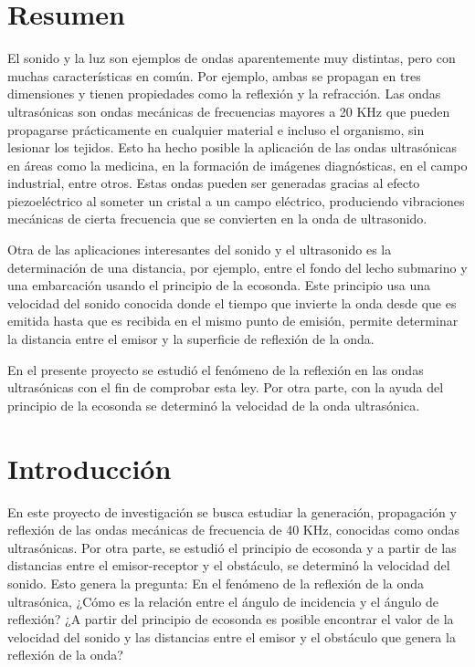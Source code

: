 \documentclass[spanish,notitlepage,letterpaper, 12pt]{article}
\begin{document}

\tableofcontents

\newpage

\section{Resumen}
El sonido y la luz son ejemplos de ondas aparentemente muy distintas, pero con
muchas características en común. Por ejemplo, ambas se propagan en tres dimensiones y
tienen propiedades como la reflexión y la refracción. Las ondas ultrasónicas son ondas
mecánicas de frecuencias mayores a 20 KHz que pueden propagarse prácticamente en
cualquier material e incluso el organismo, sin lesionar los tejidos. Esto ha hecho posible la
aplicación de las ondas ultrasónicas en áreas como la medicina, en la formación de
imágenes diagnósticas, en el campo industrial, entre otros. Estas ondas pueden ser generadas
gracias al efecto piezoeléctrico al someter un cristal a un campo eléctrico, produciendo
vibraciones mecánicas de cierta frecuencia que se convierten en la onda de ultrasonido.\par
\bigskip
Otra de las aplicaciones interesantes del sonido y el ultrasonido es la determinación de una
distancia, por ejemplo, entre el fondo del lecho submarino y una embarcación usando el
principio de la ecosonda. Este principio usa una velocidad del sonido conocida donde el
tiempo que invierte la onda desde que es emitida hasta que es recibida en el mismo punto
de emisión, permite determinar la distancia entre el emisor y la superficie de reflexión de la
onda.\par
\bigskip
En el presente proyecto se estudió el fenómeno de la reflexión en las ondas ultrasónicas
con el fin de comprobar esta ley. Por otra parte, con la ayuda del principio de la ecosonda
se determinó la velocidad de la onda ultrasónica.
\section{Introducción}
En este proyecto de investigación se busca estudiar la generación, propagación y
reflexión de las ondas mecánicas de frecuencia de 40 KHz, conocidas como ondas
ultrasónicas. Por otra parte, se estudió el principio de ecosonda y a partir de las distancias
entre el emisor-receptor y el obstáculo, se determinó la velocidad del sonido. Esto genera
la pregunta: En el fenómeno de la reflexión de la onda ultrasónica, ¿Cómo es la relación entre el ángulo de incidencia y el ángulo de reflexión? ¿A partir del principio de ecosonda
es posible encontrar el valor de la velocidad del sonido y las distancias entre el emisor y el
obstáculo que genera la reflexión de la onda?
\end{document}
